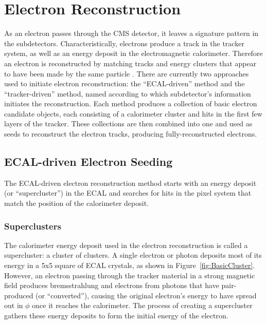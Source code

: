 \section{Electron Reconstruction}
\label{evReco:elec}
As an electron 
passes through the CMS detector, 
it leaves a signature pattern in the subdetectors.  
Characteristically, electrons produce a track 
in the tracker system, 
as well as an energy deposit in the 
electromagnetic calorimeter.  
Therefore an electron is reconstructed 
by matching tracks and energy clusters 
that appear to have been made by the same particle 
\cite{CMS-NOTE-2006-040}.  
There are currently two approaches used to 
initiate electron reconstruction: 
the ``ECAL-driven'' method and 
the ``tracker-driven'' method, 
named according to which subdetector's 
information initiates the reconstruction.  
Each method produces a collection of 
basic electron candidate objects, 
each consisting of a calorimeter cluster 
and hits in the first few layers of the tracker.  
These collections are then combined into one 
and used as seeds to reconstruct the electron tracks, 
producing fully-reconstructed electrons.  

\subsection{ECAL-driven Electron Seeding}
\label{evReco:ecalDrv}

The ECAL-driven electron reconstruction method 
starts with an energy deposit (or ``supercluster'') 
in the ECAL 
and searches for hits in the 
pixel system that match the 
position of the calorimeter deposit.  

\subsubsection{Superclusters}
\label{evReco:SC}

The calorimeter energy deposit used in the electron 
reconstruction is called a supercluster: 
a cluster of clusters.  
A single electron or photon deposits most of its energy 
in a 5x5 square of ECAL crystals, 
as shown in Figure~\ref{fig:BasicCluster}.  
However, an electron passing through the tracker material 
in a strong magnetic field produces 
bremsstrahlung and electrons from photons 
that have pair-produced (or ``converted''), 
causing the original electron's energy to 
have spread out in $\phi$ once it reaches the calorimeter.  
The process of creating a supercluster gathers these 
energy deposits to form the initial energy of the electron.  

